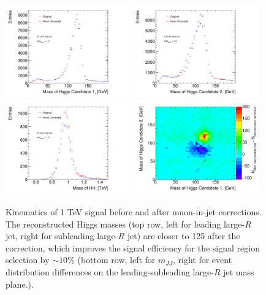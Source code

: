 \begin{figure}
\begin{center}
  \includegraphics[width=0.48\textwidth]{figures/boosted/muons/h1_mass_dbl.pdf}
  \includegraphics[width=0.48\textwidth]{figures/boosted/muons/h2_mass_dbl.pdf}
  \includegraphics[width=0.48\textwidth]{figures/boosted/muons/hh_mass_dbl.pdf}
  \includegraphics[width=0.48\textwidth]{figures/boosted/muons/h12_corr_mass.pdf}
  \caption{Kinematics of 1 TeV signal before and after muon-in-jet corrections. The reconstructed Higgs masses (top row, left for leading large-$R$ jet, right for subleading large-$R$ jet) are closer to 125 \GeV after the correction, which improves the signal efficiency for the signal region selection by $\sim\!10\%$ (bottom row, left for $m_{JJ}$, right for event distribution differences on the leading-subleading large-$R$ jet mass plane.).}
  \label{fig:boosted-muons-signal}
\end{center}
\end{figure}

